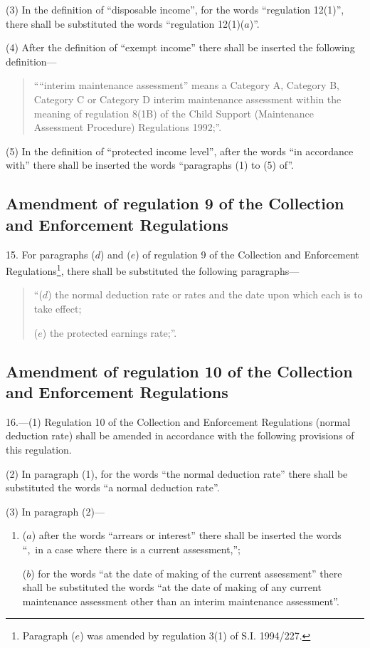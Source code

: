 \documentclass[12pt,a4paper]{article}
\begin{document}
(3) In the definition of “disposable income”, for the words “regulation 12(1)”, there shall be substituted the words “regulation 12(1)($a$)”.

(4) After the definition of “exempt income” there shall be inserted the following definition—
\begin{quotation}
““interim maintenance assessment” means a Category A, Category B, Category C or Category D interim maintenance assessment within the meaning of regulation 8(1B) of the Child Support (Maintenance Assessment Procedure) Regulations 1992;”.
\end{quotation}

(5) In the definition of “protected income level”, after the words “in accordance with” there shall be inserted the words “paragraphs (1) to (5) of”.

\subsection[15. Amendment of regulation 9 of the Collection and Enforcement Regulations]{Amendment of regulation 9 of the Collection and Enforcement Regulations}

15.  For paragraphs ($d$) and ($e$) of regulation 9 of the Collection and Enforcement Regulations\footnote{\frenchspacing Paragraph ($e$) was amended by regulation 3(1) of S.I. 1994/227.}, there shall be substituted the following paragraphs—
\begin{quotation}
“($d$) the normal deduction rate or rates and the date upon which each is to take effect;

($e$) the protected earnings rate;”.
\end{quotation}

\subsection[16. Amendment of regulation 10 of the Collection and Enforcement Regulations]{Amendment of regulation 10 of the Collection and Enforcement Regulations}

16.—(1) Regulation 10 of the Collection and Enforcement Regulations (normal deduction rate) shall be amended in accordance with the following provisions of this regulation.

(2) In paragraph (1), for the words “the normal deduction rate” there shall be substituted the words “a normal deduction rate”.

(3) In paragraph (2)—
\begin{enumerate}\item[]
($a$) after the words “arrears or interest” there shall be inserted the words “,~in a case where there is a current assessment,”;

($b$) for the words “at the date of making of the current assessment” there shall be substituted the words “at the date of making of any current maintenance assessment other than an interim maintenance assessment”.
\end{enumerate}
\end{document}

